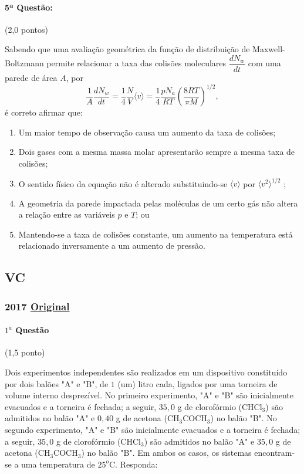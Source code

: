 \documentclass[12pt,a4paper]{article}
\newcommand{\original}[1]{\tiny \href{#1}{Original} \normalsize}
\begin{document}
\paragraph{5ª Questão:} (2,0 pontos)

Sabendo que uma avaliação geométrica da função de distribuição de Maxwell-Boltzmann permite relacionar a taxa das colisões moleculares $\dfrac{dN_{w}}{dt}$ com uma parede de área $A$, por
\begin{equation*}
  \dfrac{1}{A} \dfrac{dN_{w}}{dt} = \dfrac{1}{4} \dfrac{N}{V} \langle v \rangle = \dfrac{1}{4} \dfrac{pN_{a}}{RT} \left( \dfrac{8RT}{\pi M} \right)^{1/2},
\end{equation*} é correto afirmar que:

\begin{enumerate} [label = (\alph*)]
    \item Um maior tempo de observação causa um aumento da taxa de colisões;
    \item Dois gases com a mesma massa molar apresentarão sempre a mesma taxa de colisões;
    \item O sentido físico da equação não é alterado substituindo-se $\langle v \rangle$ por $\langle v^{2} \rangle^{1/2}$ ;
    \item A geometria da parede impactada pelas moléculas de um certo gás não altera a relação entre as variáveis $p$ e $T$; ou
    \item Mantendo-se a taxa de colisões constante, um aumento na temperatura está relacionado inversamente a um aumento de pressão.
    
\end{enumerate}

\newpage


\subsection{VC}
\subsubsection{2017 \original{https://drive.google.com/file/d/1o8bV6XM_a2c-SkpdeQMM-RUzzHDn-P3k/view?usp=sharing}}

\paragraph{$1^a$ Questão} (1,5 ponto)

Dois experimentos independentes são realizados em um dispositivo constituído por dois balões "A" e "B", de $1$ (um) litro cada, ligados por
uma torneira de volume interno desprezível. No primeiro experimento, "A" e "B" são inicialmente evacuados e a torneira é fechada; a seguir, $35,0$ g
de clorofórmio (CHCl$_3$) são admitidos no balão "A" e $0,40$ g de acetona (CH$_3$COCH$_3$) no balão "B". No segundo experimento, "A" e "B" são inicialmente 
evacuados e a torneira é fechada; a seguir, $35,0$ g de clorofórmio (CHCl$_3$) são admitidos no balão "A" e $35,0$ g de acetona (CH$_3$COCH$_3$) no balão "B". Em
ambos os casos, os sistemas encontram-se a uma temperatura de $25^o$C. Responda:
\end{document}
